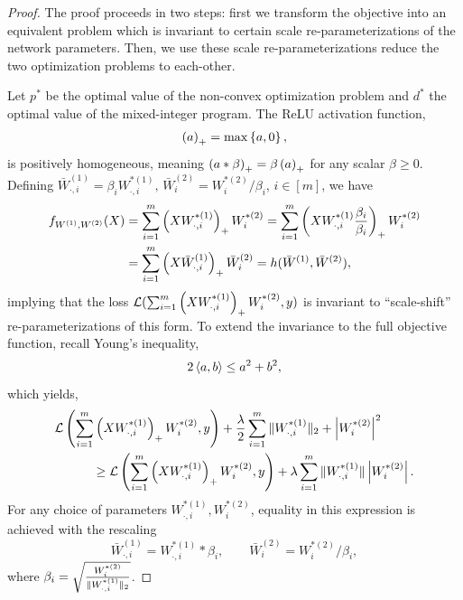 \begin{proof}
    The proof proceeds in two steps: first we transform the objective into an equivalent problem which is invariant to certain scale re-parameterizations of the network parameters.
    Then, we use these scale re-parameterizations reduce the two optimization problems to each-other.

    Let \( p^* \) be the optimal value of the non-convex optimization problem and \( d^* \) the optimal value of the mixed-integer program.
    The ReLU activation function,
    \begin{align*}
        \left(a\right)_+ = \max\left\{a, 0\right\},
    \end{align*}
    is positively homogeneous, meaning \( \left(a * \beta\right)_+ = \beta \left(a\right)_+ \) for any scalar \( \beta \geq 0 \).
    Defining \( \bar{W}^{(1)}_{\cdot, i} = \beta_i W^{*(1)}_{\cdot, i}, \, \bar{W}^{(2)}_{i} = W^{*(2)}_{i} / \beta_i \), \( i \in [m] \), we have
    \begin{align*}
        f_{W^{(1)}, W^{(2)}}(X)
         & = \sum_{i=1}^m \left(X W^{*(1)}_{\cdot, i} \right)_+ W^{*(2)}_{i}
        = \sum_{i=1}^m \left(X W^{*(1)}_{\cdot, i} \frac{\beta_i}{\beta_i}\right)_+ W^{*(2)}_{i} \\
         & = \sum_{i=1}^m \left(X \bar{W}^{(1)}_{\cdot, i}\right)_+ \bar{W}^{(2)}_{i}
        = h(\bar{W}^{(1)}, \bar{W}^{(2)}),
    \end{align*}
    implying that the loss \( \mathcal{L}(\sum_{i=1}^m \left(X W^{*(1)}_{\cdot, i} \right)_+
    W^{*(2)}_{i}, y) \) is invariant to ``scale-shift'' re-parameterizations of
    this form.
    To extend the invariance to the full objective function, recall Young's inequality,
    \[
        2 \left\langle a, b\right\rangle \leq a^2 + b^2,
    \]
    which yields,
    \begin{align*}
         & \mathcal{L}\left(\sum_{i = 1}^m \left(X W^{*(1)}_{\cdot, i} \right)_+ W^{*(2)}_{i}, y \right) + \frac{\lambda}{2} \sum_{i = 1}^m \|W^{*(1)}_{\cdot, i}\|_2 + \left\vert W^{*(2)}_{i}\right\vert^2    \\
         & \hspace{3em} \geq \mathcal{L}\left( \sum_{i = 1}^m \left(X W^{*(1)}_{\cdot, i} \right)_+ W^{*(2)}_{i}, y \right) + \lambda \sum_{i = 1}^m \|W^{*(1)}_{\cdot, i}\|\left\vert W^{*(2)}_{i}\right\vert.
    \end{align*}
    For any choice of parameters \( W^{*(1)}_{\cdot, i}, W^{*(2)}_{i} \),
    equality in this expression is achieved with the rescaling
    \[
        \bar{W}^{(1)}_{\cdot, i} = W^{*(1)}_{\cdot, i} * \beta_i, \quad \quad \bar{W}^{(2)}_{i} = W^{*(2)}_{i} / \beta_i,
    \]
    where \( \beta_i = \sqrt{\frac{W^{*(2)}_{i}}{\|W^{*(1)}_{\cdot, i}\|_2}} \).

\end{proof}
